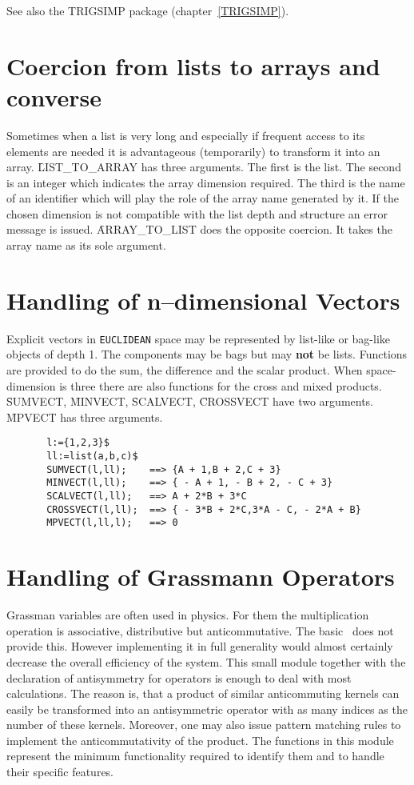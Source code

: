 See also the TRIGSIMP package (chapter~\ref{TRIGSIMP}).

\section{Coercion from lists to arrays and converse}

Sometimes when a list is very long and especially if frequent access
to its elements are needed it is advantageous (temporarily) to
transform it into an array.
\f{LIST\_TO\_ARRAY} has three arguments.  The
first is the list.  The second is an integer which indicates the array
dimension required.  The third is the name of an identifier which will
play the role of the array name generated by it.  If the chosen
dimension is not compatible with the list depth and structure an error
message is issued.  \f{ARRAY\_TO\_LIST} does
the opposite coercion.  It takes the array name as its sole argument.

\section{Handling of n--dimensional Vectors}

Explicit vectors in {\tt EUCLIDEAN} space may be represented by
list-like or bag-like objects of depth 1.  The components may be bags
but may {\bf not} be lists.  Functions are provided to do the sum, the
difference and the scalar product.  When space-dimension is three
there are also functions for the cross and mixed products.
\f{SUMVECT}, \f{MINVECT},
\f{SCALVECT}, \f{CROSSVECT} have
two arguments.  \f{MPVECT} has three arguments.
\begin{verbatim}
       l:={1,2,3}$
       ll:=list(a,b,c)$
       SUMVECT(l,ll);    ==> {A + 1,B + 2,C + 3}
       MINVECT(l,ll);    ==> { - A + 1, - B + 2, - C + 3}
       SCALVECT(l,ll);   ==> A + 2*B + 3*C
       CROSSVECT(l,ll);  ==> { - 3*B + 2*C,3*A - C, - 2*A + B}
       MPVECT(l,ll,l);   ==> 0
\end{verbatim}

\section{Handling of Grassmann Operators}

Grassman variables are often used in physics.  For them the
multiplication operation is associative, distributive but
anticommutative.  The basic \REDUCE\ does not provide this.
However implementing it in full generality would almost certainly
decrease the overall efficiency of the system.  This small module
together with the declaration of antisymmetry for operators is enough
to deal with most calculations.  The reason is, that a product of
similar anticommuting kernels can easily be transformed into an
antisymmetric operator with as many indices as the number of these
kernels.  Moreover, one may also issue pattern matching rules to
implement the anticommutativity of the product.  The functions in this
module represent the minimum functionality required to identify them
and to handle their specific features.

